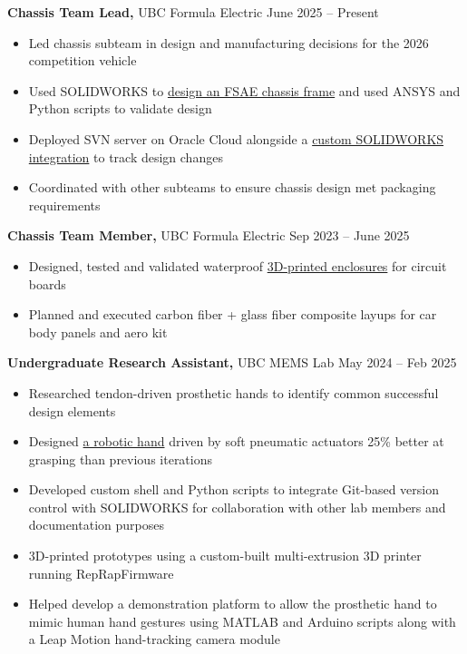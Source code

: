 \documentclass[11pt]{article}       %
\begin{document}
\textbf{Chassis Team Lead,} {UBC Formula Electric} \hfill June 2025 -- Present \\
\vspace{-8.5pt}
\begin{itemize}
  \item Led chassis subteam in design and manufacturing decisions for the 2026 competition vehicle
  \item Used SOLIDWORKS to \href{https://www.danielrbenjamin.com/projects/formula-frame-design.html}{design an FSAE chassis frame} and used ANSYS and Python scripts to validate design
  \item Deployed SVN server on Oracle Cloud alongside a \href{https://www.danielrbenjamin.com/projects/svnworks.html}{custom SOLIDWORKS integration} to track design changes
  \item Coordinated with other subteams to ensure chassis design met packaging requirements
\end{itemize}

\textbf{Chassis Team Member,} {UBC Formula Electric} \hfill Sep 2023 -- June 2025 \\
\vspace{-8.5pt}
\begin{itemize}
  \item Designed, tested and validated waterproof \href{https://www.danielrbenjamin.com/projects/formula.html}{3D-printed enclosures} for circuit boards
  \item Planned and executed carbon fiber + glass fiber composite layups for car body panels and aero kit
\end{itemize}

\textbf{Undergraduate Research Assistant,} {UBC MEMS Lab} \hfill May 2024 -- Feb 2025 \\
\vspace{-8.5pt}
\begin{itemize}
  \item Researched tendon-driven prosthetic hands to identify common successful design elements
  \item Designed \href{https://www.danielrbenjamin.com/projects/MEMS-hand.html}{a robotic hand} driven by soft pneumatic actuators 25\% better at grasping than previous iterations
  \item Developed custom shell and Python scripts to integrate Git-based version control with SOLIDWORKS for collaboration with other lab members and documentation purposes
  \item 3D-printed prototypes using a custom-built multi-extrusion 3D printer running RepRapFirmware
  \item Helped develop a demonstration platform to allow the prosthetic hand to mimic human hand gestures using MATLAB and Arduino scripts along with a Leap Motion hand-tracking camera module
\end{itemize}
\end{document}
